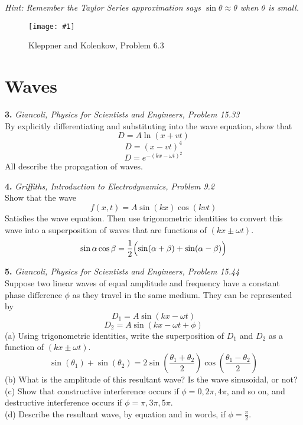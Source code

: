 \documentclass[11pt]{article}
\newcommand{\fig}[4]{
    \begin{figure}[H]
        \centering
        \texttt{[image: \#1]}
        \caption{#2}
        \label{exp4fit}
    \end{figure}
}
\theoremstyle{gangnamstyle}{\newtheorem{definition}{Definition}[]}
\theoremstyle{gangnamstyle}{\newtheorem{example}{Example}[]}
\theoremstyle{gangnamstyle}{\newtheorem{problem}{Problem}[]}
\begin{document}
\textit{Hint: Remember the Taylor Series approximation says $\sin\theta \approx \theta$ when $\theta$ is small.}

\fig{figs/0729/kk63.png}{Kleppner and Kolenkow, Problem 6.3}{0.5}{0}

\pagebreak

\section{Waves}

\textbf{3.} \textit{Giancoli, Physics for Scientists and Engineers, Problem 15.33} \\
By explicitly differentiating and substituting into the wave equation, show that
\[ D = A\ln(x + vt) \]
\[ D = (x - vt)^4 \]
\[ D = e^{-(kx - \omega t)^2} \]
All describe the propagation of waves. 

\pagebreak

\textbf{4.} \textit{Griffiths, Introduction to Electrodynamics, Problem 9.2} \\
Show that the wave
\[ f(x, t) = A\sin(kx)\cos(kvt) \]
Satisfies the wave equation. Then use trigonometric identities to convert this wave into a superposition of waves that are functions of $(kx \pm \omega t)$. 
\[ \sin\alpha\cos\beta = \frac{1}{2}\Bigl(\sin(\alpha + \beta) + \sin(\alpha - \beta)\Bigr) \]

\pagebreak

\textbf{5.} \textit{Giancoli, Physics for Scientists and Engineers, Problem 15.44} \\
Suppose two linear waves of equal amplitude and frequency have a constant phase difference $\phi$ as they travel in the same medium. They can be represented by
\[ D_1 = A\sin(kx - \omega t) \]
\[ D_2 = A\sin(kx - \omega t + \phi) \]
(a) Using trigonometric identities, write the superposition of $D_1$ and $D_2$ as a function of $(kx \pm \omega t)$. \\
\[ \sin(\theta_1) + \sin(\theta_2) = 2\sin(\frac{\theta_1 + \theta_2}{2})\cos(\frac{\theta_1 - \theta_2}{2}) \]
(b) What is the amplitude of this resultant wave? Is the wave sinusoidal, or not? \\
(c) Show that constructive interference occurs if $\phi = 0, 2\pi, 4\pi$, and so on, and destructive interference occurs if $\phi = \pi, 3\pi, 5\pi$. \\
(d) Describe the resultant wave, by equation and in words, if $\phi = \frac{\pi}{2}$. 

\pagebreak
\end{document}
